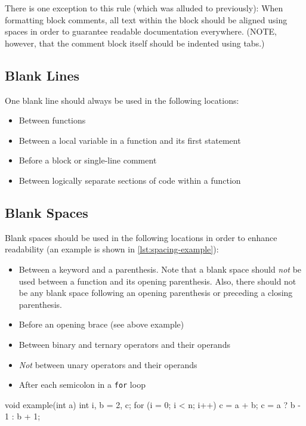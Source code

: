 \documentclass[11pt]{book}
\begin{document}
There is one exception to this rule (which was alluded to previously):
When formatting block comments, all text within the block should be
aligned using spaces in order to guarantee readable documentation
everywhere. (NOTE, however, that the comment block itself should be
indented using tabs.)

\subsection{Blank Lines}\label{blank-lines}

One blank line should always be used in the following locations:

\begin{itemize}
\item
  Between functions
\item
  Between a local variable in a function and its first statement
\item
  Before a block or single-line comment
\item
  Between logically separate sections of code within a function
\end{itemize}

\subsection{Blank Spaces}\label{blank-spaces}

Blank spaces should be used in the following locations in order to enhance
readability (an example is shown in \autoref{lst:spacing-example}):

\begin{itemize}
\item
  Between a keyword and a parenthesis. Note that a blank space should
  \emph{not} be used between a function and its opening parenthesis. Also,
  there should not be any blank space following an opening parenthesis
  or preceding a closing parenthesis.
\item
  Before an opening brace (see above example)
\item
  Between binary and ternary operators and their operands
\item
  \emph{Not} between unary operators and their operands
\item
  After each semicolon in a \texttt{for} loop
\end{itemize}

\begin{code}[caption=Spacing example, label=lst:spacing-example]
void example(int a) {
	int i, b = 2, c;
	for (i = 0; i < n; i++) {
		c = a + b;
		c = a ? b - 1 : b + 1;
	}
}
\end{code}
\end{document}
